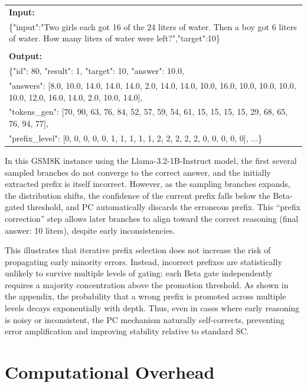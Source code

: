\begin{table}[h]
    \setlength{\abovecaptionskip}{0.1cm}
    \centering
    \small
    \begin{tabularx}{0.95\columnwidth}{@{}X@{}}
        \toprule
        \textbf{Input:} \\
        \{"input":"Two girls each got 1\/6 of the 24 liters of water. Then a boy got 6 liters of water. How many liters of water were left?","target":10\} \\\\

        \textbf{Output:} \\
\{"id": 80, "result": 1, "target": 10, "answer": 10.0, \\
"answers": [8.0, 10.0, 14.0, 14.0, 14.0, 2.0, 14.0, 14.0, 10.0, 16.0, 10.0, 10.0, 10.0, 10.0, 12.0, 16.0, 14.0, 2.0, 10.0, 14.0], \\
"tokens\_gen": [70, 90, 63, 76, 84, 52, 57, 59, 54, 61, 15, 15, 15, 15, 29, 68, 65, 76, 94, 77], \\
"prefix\_level": [0, 0, 0, 0, 0, 1, 1, 1, 1, 1, 2, 2, 2, 2, 2, 0, 0, 0, 0, 0], ...\} \\
        \bottomrule
    \end{tabularx}
\end{table}

In this GSM8K instance using the Llama-3.2-1B-Instruct model, the first several sampled branches do not converge to the correct answer, and the initially extracted prefix is itself incorrect. However, as the sampling branches expands, the distribution shifts, the confidence of the current prefix falls below the Beta-gated threshold, and PC automatically discards the erroneous prefix. This “prefix correction” step allows later branches to align toward the correct reasoning (final answer: 10 liters), despite early inconsistencies.

This illustrates that iterative prefix selection does not increase the risk of propagating early minority errors. Instead, incorrect prefixes are statistically unlikely to survive multiple levels of gating: each Beta gate independently requires a majority concentration above the promotion threshold. As shown in the appendix, the probability that a wrong prefix is promoted across multiple levels decays exponentially with depth. Thus, even in cases where early reasoning is noisy or inconsistent, the PC mechanism naturally self-corrects, preventing error amplification and improving stability relative to standard SC.

\section{Computational Overhead}
\label{app:overhead}

